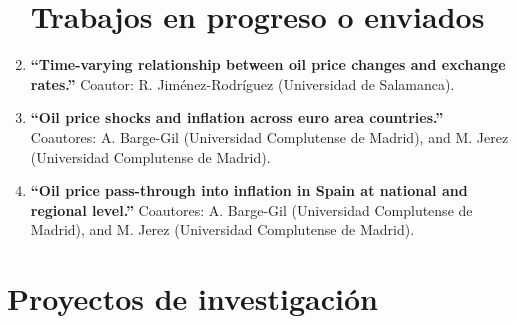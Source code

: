 \documentclass[11pt]{article}\usepackage[]{graphicx}\usepackage[]{color}
\begin{document}
\begin{enumerate}
\noindent
\section{Trabajos en progreso o enviados}

\item \textbf{``Time-varying relationship between oil price changes and exchange rates.''} Coautor: R. Jiménez-Rodríguez (Universidad de Salamanca).

\item \textbf{``Oil price shocks and inflation across euro area countries.''} Coautores: A. Barge-Gil (Universidad Complutense de Madrid), and M. Jerez (Universidad Complutense de Madrid).

\item \textbf{``Oil price pass-through into inflation in Spain at national and regional level.''} Coautores: A. Barge-Gil (Universidad Complutense de Madrid), and M. Jerez (Universidad Complutense de Madrid).
\\
\end{enumerate}

\section{Proyectos de investigación} 
\end{document}

